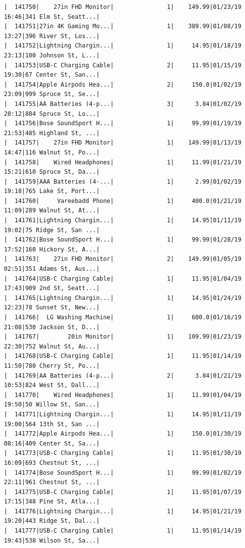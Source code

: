 \documentclass[
  letterpaper,
  DIV=11,
  numbers=noendperiod]{scrartcl}
\begin{document}
\begin{verbatim}
|  141750|    27in FHD Monitor|               1|    149.99|01/23/19 16:46|341 Elm St, Seatt...|
|  141751|27in 4K Gaming Mo...|               1|    389.99|01/08/19 13:27|396 River St, Los...|
|  141752|Lightning Chargin...|               1|     14.95|01/18/19 23:13|100 Johnson St, L...|
|  141753|USB-C Charging Cable|               2|     11.95|01/15/19 19:30|67 Center St, San...|
|  141754|Apple Airpods Hea...|               2|     150.0|01/02/19 23:09|999 Spruce St, Se...|
|  141755|AA Batteries (4-p...|               3|      3.84|01/02/19 20:12|884 Spruce St, Lo...|
|  141756|Bose SoundSport H...|               1|     99.99|01/19/19 21:53|485 Highland St, ...|
|  141757|    27in FHD Monitor|               1|    149.99|01/13/19 14:47|116 Walnut St, Po...|
|  141758|    Wired Headphones|               1|     11.99|01/21/19 15:21|610 Spruce St, Da...|
|  141759|AAA Batteries (4-...|               1|      2.99|01/02/19 19:18|765 Lake St, Port...|
|  141760|     Vareebadd Phone|               1|     400.0|01/21/19 11:09|289 Walnut St, At...|
|  141761|Lightning Chargin...|               1|     14.95|01/11/19 19:02|75 Ridge St, San ...|
|  141762|Bose SoundSport H...|               1|     99.99|01/28/19 17:52|160 Hickory St, A...|
|  141763|    27in FHD Monitor|               2|    149.99|01/05/19 02:51|351 Adams St, Aus...|
|  141764|USB-C Charging Cable|               1|     11.95|01/04/19 17:43|909 2nd St, Seatt...|
|  141765|Lightning Chargin...|               1|     14.95|01/24/19 12:23|78 Sunset St, New...|
|  141766|  LG Washing Machine|               1|     600.0|01/16/19 21:08|530 Jackson St, D...|
|  141767|        20in Monitor|               1|    109.99|01/23/19 22:30|752 Walnut St, Au...|
|  141768|USB-C Charging Cable|               1|     11.95|01/14/19 11:50|780 Cherry St, Po...|
|  141769|AA Batteries (4-p...|               2|      3.84|01/21/19 10:53|824 West St, Dall...|
|  141770|    Wired Headphones|               1|     11.99|01/04/19 19:50|50 Willow St, San...|
|  141771|Lightning Chargin...|               1|     14.95|01/11/19 19:00|564 13th St, San ...|
|  141772|Apple Airpods Hea...|               1|     150.0|01/30/19 08:16|409 Center St, Sa...|
|  141773|USB-C Charging Cable|               1|     11.95|01/30/19 16:09|693 Chestnut St, ...|
|  141774|Bose SoundSport H...|               1|     99.99|01/02/19 22:11|961 Chestnut St, ...|
|  141775|USB-C Charging Cable|               1|     11.95|01/07/19 17:15|348 Pine St, Atla...|
|  141776|Lightning Chargin...|               1|     14.95|01/21/19 19:20|443 Ridge St, Dal...|
|  141777|USB-C Charging Cable|               1|     11.95|01/14/19 19:43|538 Wilson St, Sa...|

\end{verbatim}
\end{document}
